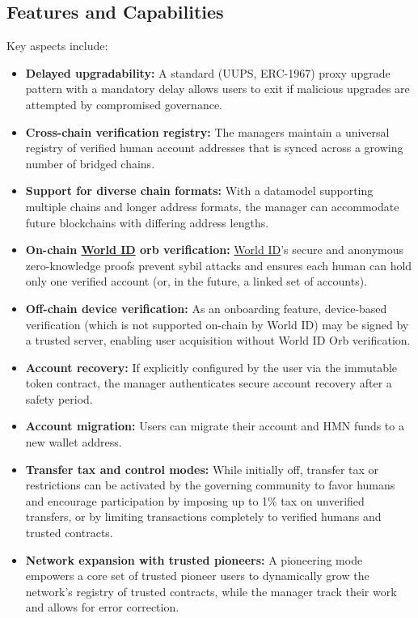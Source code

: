 \documentclass[12pt,a4paper]{article}
\begin{document}
\subsection{Features and Capabilities}
Key aspects include:
\begin{itemize}
    \item \textbf{Delayed upgradability:} A standard (UUPS, ERC-1967) proxy upgrade pattern with a mandatory delay allows users to exit if malicious upgrades are attempted by compromised governance.
    \item \textbf{Cross-chain verification registry:} The managers maintain a universal registry of verified human account addresses that is synced across a growing number of bridged chains.
    \item \textbf{Support for diverse chain formats:} With a datamodel supporting multiple chains and longer address formats, the manager can accommodate future blockchains with differing address lengths.
    \item \textbf{On-chain \href{https://world.org/world-id}{World ID} orb verification:} \href{https://world.org/world-id}{World ID}'s secure and anonymous zero-knowledge proofs prevent sybil attacks and ensures each human can hold only one verified account (or, in the future, a linked set of accounts).
    \item \textbf{Off-chain device verification:} As an onboarding feature, device-based verification (which is not supported on-chain by World ID) may be signed by a trusted server, enabling user acquisition without World ID Orb verification.
    \item \textbf{Account recovery:} If explicitly configured by the user via the immutable token contract, the manager authenticates secure account recovery after a safety period.
    \item \textbf{Account migration:} Users can migrate their account and HMN funds to a new wallet address.
    \item \textbf{Transfer tax and control modes:} While initially off, transfer tax or restrictions can be activated by the governing community to favor humans and encourage participation by imposing up to 1\% tax on unverified transfers, or by limiting transactions completely to verified humans and trusted contracts.
    \item \textbf{Network expansion with trusted pioneers:} A pioneering mode empowers a core set of trusted pioneer users to dynamically grow the network's registry of trusted contracts, while the manager track their work and allows for error correction.

\end{itemize}
\end{document}
